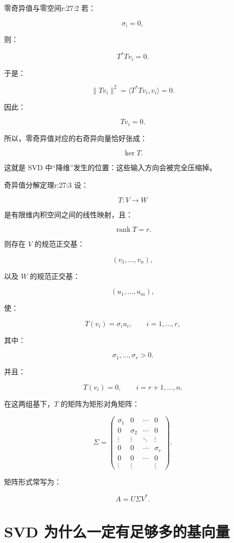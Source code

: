 \begin{jprop}{零奇异值与零空间}{r:27:2}
若：

\[
\sigma_i=0,
\]

则：

\[
T^*Tv_i=0.
\]

于是：

\[
\|Tv_i\|^2
=
\langle T^*Tv_i,v_i\rangle
=
0.
\]

因此：

\[
Tv_i=0.
\]

所以，零奇异值对应的右奇异向量恰好张成：

\[
\ker T.
\]

这就是 SVD 中“降维”发生的位置：这些输入方向会被完全压缩掉。
\end{jprop}

\begin{jthm}{奇异值分解定理}{r:27:3}
设：

\[
T:V\to W
\]

是有限维内积空间之间的线性映射，且：

\[
\operatorname{rank}T=r.
\]

则存在 $V$ 的规范正交基：

\[
(v_1,\ldots,v_n),
\]

以及 $W$ 的规范正交基：

\[
(u_1,\ldots,u_m),
\]

使：

\[
T(v_i)=\sigma_i u_i,
\qquad
i=1,\ldots,r,
\]

其中：

\[
\sigma_1,\ldots,\sigma_r>0.
\]

并且：

\[
T(v_i)=0,
\qquad
i=r+1,\ldots,n.
\]

在这两组基下，$T$ 的矩阵为矩形对角矩阵：

\[
\Sigma
=
\begin{pmatrix}
\sigma_1 & 0 & \cdots & 0\\
0 & \sigma_2 & \cdots & 0\\
\vdots & \vdots & \ddots & \vdots\\
0 & 0 & \cdots & \sigma_r\\
0 & 0 & \cdots & 0\\
\vdots & \vdots & & \vdots
\end{pmatrix}.
\]

矩阵形式常写为：

\[
A=U\Sigma V^*.
\]
\end{jthm}

\section{SVD 为什么一定有足够多的基向量}

